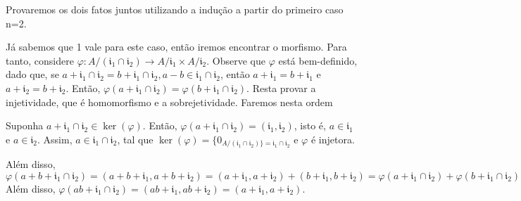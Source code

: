 \documentclass[AlgebraII/algebraII_notes.tex]{subfiles}
\begin{document}
\begin{proof*}
	Provaremos os dois fatos juntos utilizando a indução a partir do primeiro caso n=2.

	Já sabemos que 1 vale para este caso, então iremos encontrar o morfismo. Para tanto, considere \(\varphi :A/(\mathfrak{i}_{1}\cap \mathfrak{i}_{2})\rightarrow A/\mathfrak{i}_{1}\times A/\mathfrak{i}_{2}.\)
	Observe que \(\varphi \) está bem-definido, dado que, se \(a+\mathfrak{i}_{1}\cap \mathfrak{i}_{2} = b + \mathfrak{i}_{1}\cap \mathfrak{i}_{2}, a-b\in \mathfrak{i}_{1}\cap \mathfrak{i}_2\),
	então \(a+\mathfrak{i}_{1} = b + \mathfrak{i}_{1}\) e \(a + \mathfrak{i}_{2} = b + \mathfrak{i}_{2}.\) Então, \(\varphi(a+\mathfrak{i}_{1}\cap \mathfrak{i}_{2}) = \varphi(b+\mathfrak{i}_{1}\cap \mathfrak{i}_{2}).\)
	Resta provar a injetividade, que é homomorfismo e a sobrejetividade. Faremos nesta ordem

	Suponha \(a+\mathfrak{i}_{1}\cap \mathfrak{i}_{2}\in\ker{(\varphi )}\). Então, \(\varphi (a + \mathfrak{i}_{1}\cap \mathfrak{i}_{2}) = (\mathfrak{i}_{1}, \mathfrak{i}_{2})\),
	isto é, \(a\in \mathfrak{i}_{1}\) e \(a\in \mathfrak{i}_{2}.\) Assim, \(a\in \mathfrak{i}_{1}\cap \mathfrak{i}_{2}\), tal que \(\ker{(\varphi )} = \{0_{A/(\mathfrak{i}_{1}\cap \mathfrak{i}_{2})\} = \mathfrak{i}_{1}\cap \mathfrak{i}_{2}}\)
	e \(\varphi \) é injetora.

	Além disso, \(\varphi (a + b + \mathfrak{i}_{1}\cap \mathfrak{i}_{2}) = (a+b+\mathfrak{i}_{1}, a + b + \mathfrak{i}_{2}) =
	(a + \mathfrak{i}_{1}, a + \mathfrak{i}_{2}) + (b+\mathfrak{i}_{1}, b + \mathfrak{i}_{2}) = \varphi(a + \mathfrak{i}_{1}\cap \mathfrak{i}_{2}) + \varphi(b + \mathfrak{i}_{1}\cap \mathfrak{i}_{2}).\)
	Além disso, \(\varphi (ab + \mathfrak{i}_{1}\cap \mathfrak{i}_{2}) = (ab + \mathfrak{i}_{1}, ab+ \mathfrak{i}_{2}) = (a+\mathfrak{i}_{1}, a+\mathfrak{i}_{2}).\)


\end{proof*}
\end{document}
